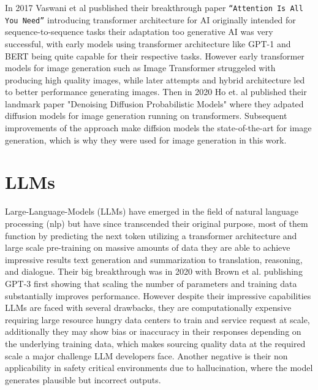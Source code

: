 \documentclass[
  a4paper,  %
  twoside,  %
  bibliography=totoc,
  headsepline,
  cleardoublepage=empty,
  parskip=half,
  draft=false
]{scrbook}
\begin{document}
In 2017 Vaswani et al pusblished their breakthrough paper \verb|“Attention Is All You Need”| \cite{vaswani2023attentionneed} introducing transformer architecture for AI %
originally intended for sequence-to-sequence tasks their adaptation too generative AI was very successful, with early models using transformer architecture like GPT-1 \cite{GPT-1} and BERT \cite{devlin2019bertpretrainingdeepbidirectional} being quite capable for their respective tasks. However early transformer models for image generation such as Image Transformer \cite{parmar2018imagetransformer} struggeled with producing high quality images, while later attempts and hybrid architecture led to better performance generating images. Then in 2020 Ho et. al published their landmark paper "Denoising Diffusion Probabilistic Models" where they adpated diffusion models for image generation running on transformers.
Subsequent improvements of the approach make diffsion models the state-of-the-art for image generation, which is why they were used for image generation in this work. %

\section{LLMs}
Large-Language-Models (LLMs) have emerged in the field of natural language processing (nlp) but have since transcended their original purpose, most of them function by predicting the next token utilizing a transformer architecture and large scale pre-training on massive amounts of data they are able to achieve impressive results text generation and summarization to translation, reasoning, and dialogue. Their big breakthrough was in 2020 with Brown et al. publishing GPT-3 \cite{brown2020languagemodelsfewshotlearners} first showing  that scaling the number of parameters and training data substantially improves performance. However despite their impressive capabilities LLMs are faced with several drawbacks, they are computationally expensive requiring large resource hungry data centers to train and service request at scale, additionally they may show bias or inaccuracy in their responses depending on the underlying training data, which makes sourcing quality data at the required scale a major challenge LLM developers face. Another negative is their non applicability in safety critical environments due to hallucination, where the model generates plausible but incorrect outputs.
\end{document}
